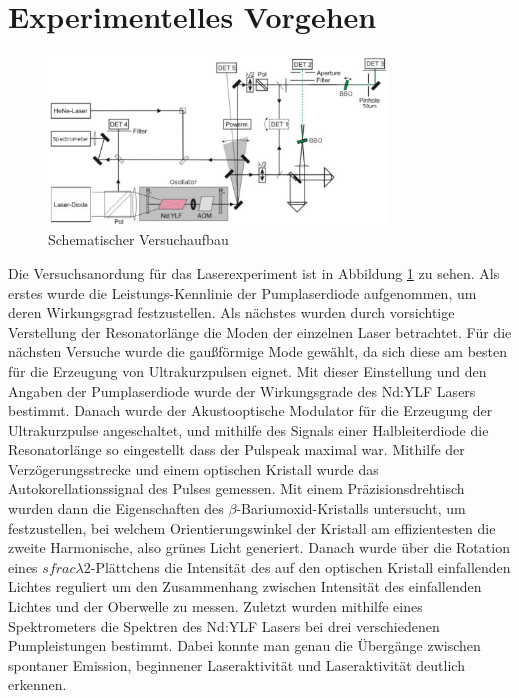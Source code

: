 \section{Experimentelles Vorgehen}
\begin{figure}[]
  \centering
  \includegraphics[width = 0.8\textwidth]{Bilder/Versuchsaufbau.png}
  \caption{Schematischer Versuchaufbau}
  \label{fig:versuchsaufbau}
\end{figure}
Die Versuchsanordung für das Laserexperiment ist in Abbildung \ref{fig:versuchsaufbau}
zu sehen. Als erstes wurde die Leistungs-Kennlinie der Pumplaserdiode aufgenommen, um deren Wirkungsgrad festzustellen.
Als nächstes wurden durch vorsichtige Verstellung der Resonatorlänge die Moden der einzelnen Laser betrachtet.
Für die nächsten Versuche wurde die gaußförmige Mode gewählt, da sich diese am besten für
die Erzeugung von Ultrakurzpulsen eignet.
Mit dieser Einstellung und den Angaben der Pumplaserdiode wurde der
Wirkungsgrade des Nd:YLF Lasers bestimmt. 
Danach wurde der Akustooptische Modulator für die Erzeugung der Ultrakurzpulse angeschaltet, und mithilfe des Signals einer Halbleiterdiode die Resonatorlänge so eingestellt dass der Pulspeak maximal war.
Mithilfe der Verzögerungsstrecke und einem optischen Kristall wurde das Autokorellationssignal des Pulses gemessen.
Mit einem Präzisionsdrehtisch wurden dann die Eigenschaften des $\beta$-Bariumoxid-Kristalls untersucht, um festzustellen, bei welchem Orientierungswinkel der Kristall am effizientesten die zweite Harmonische, also grünes Licht generiert.
Danach wurde über die Rotation eines $sfrac{\lambda}{2}$-Plättchens die Intensität des auf den optischen Kristall einfallenden Lichtes reguliert um den Zusammenhang zwischen Intensität des einfallenden Lichtes und der Oberwelle zu messen.
Zuletzt wurden mithilfe eines Spektrometers die Spektren des Nd:YLF Lasers bei drei verschiedenen Pumpleistungen bestimmt. Dabei konnte man genau die Übergänge zwischen spontaner Emission, beginnener Laseraktivität und Laseraktivität deutlich erkennen.

